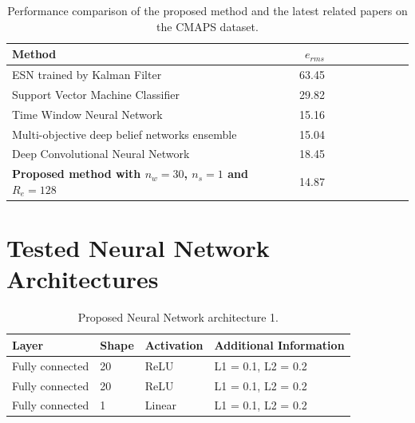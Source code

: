 \documentclass[12pt]{IEEEtran}%
\begin{document}
\begin{table}
\begin{center}
\caption{Performance comparison of the proposed method and the latest related papers on the CMAPS dataset.}%
%
\begin{tabular}
[c]{l|rrrr|rrrr}\hline
Method & $e_{rms}$ &  &  &  &  &  &  & \\\hline
ESN trained by Kalman Filter \cite{Peng2012} & 63.45 &  &  &  &  &  &  & \\
Support Vector Machine Classifier \cite{Louen2013} & 29.82 &  &  &  &  &  &  &
\\
Time Window Neural Network \cite{Lim2016} & 15.16 &  &  &  &  &  &  & \\
Multi-objective deep belief networks ensemble \cite{Zhang2016} & 15.04 &  &  &
&  &  &  & \\
Deep Convolutional Neural Network \cite{Babu2016} & 18.45 &  &  &  &  &  &  &
\\
\textbf{Proposed method with $n_{w} = 30$, $n_{s}=1$ and $R_{e} = 128$} &
14.87 &  &  &  &  &  &  & \\\hline
\end{tabular}
\label{table:results_comparison}%
\end{center}
\end{table}

\newpage

\appendix

\section*{Tested Neural Network Architectures}
\label{sec:appendices}


\begin{table}[tbh]
\centering
\begin{tabular}
[c]{llll}\hline
Layer & Shape & Activation & Additional Information\\\hline\hline
Fully connected & 20 & ReLU & L1 = 0.1, L2 = 0.2\\
Fully connected & 20 & ReLU & L1 = 0.1, L2 = 0.2\\
Fully connected & 1 & Linear & L1 = 0.1, L2 = 0.2\\\hline
\end{tabular}
\caption{Proposed Neural Network architecture 1.}%
\label{table:proposed_nn_1}%
\end{table}
\end{document}
